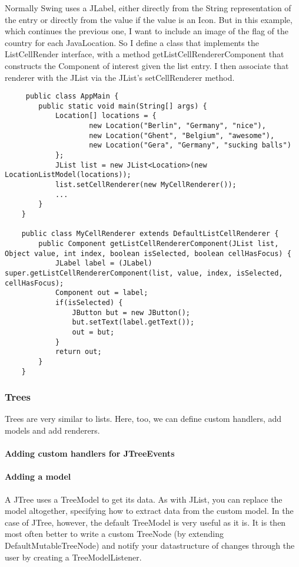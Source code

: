 Normally Swing uses a JLabel, either directly from the String representation of the entry or directly from the value if the value is an Icon. But in this example, which continues the previous one, I want to include an image of the flag of the country for each JavaLocation. So I define a class that implements the ListCellRender interface, with a method getListCellRendererComponent that constructs the Component of interest given the list entry. I then associate that renderer with the JList via the JList's setCellRenderer method. 

\begin{lstlisting}
     public class AppMain {
    	public static void main(String[] args) {
    		Location[] locations = {
    				new Location("Berlin", "Germany", "nice"),
    				new Location("Ghent", "Belgium", "awesome"),
    				new Location("Gera", "Germany", "sucking balls")
    		};
    		JList list = new JList<Location>(new LocationListModel(locations));
    		list.setCellRenderer(new MyCellRenderer());
    		...
    	}
	}
	
	public class MyCellRenderer extends DefaultListCellRenderer {
    	public Component getListCellRendererComponent(JList list, Object value, int index, boolean isSelected, boolean cellHasFocus) {
    		JLabel label = (JLabel) super.getListCellRendererComponent(list, value, index, isSelected, cellHasFocus);
    		Component out = label;
    		if(isSelected) {
    			JButton but = new JButton();
    			but.setText(label.getText());
    			out = but;
    		}
    		return out;
    	}
    }
\end{lstlisting}
 
 
 \subsubsection{Trees}
 
 Trees are very similar to lists. Here, too, we can define custom handlers, add models and add renderers.
 
 \paragraph{Adding custom handlers for JTreeEvents}
 
 \paragraph{Adding a model} A JTree uses a TreeModel to get its data. As with JList, you can replace the model altogether, specifying how to extract data from the custom model. In the case of JTree, however, the default TreeModel is very useful as it is. It is then most often better to write a custom TreeNode (by extending DefaultMutableTreeNode) and notify your datastructure of changes through the user by creating a TreeModelListener.
 
